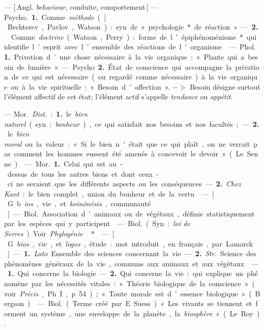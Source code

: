 \begin{itemize}[leftmargin=1cm, label=, itemsep=1pt]
 — [\,Angl. {\it behaviour}, conduite, comportement\,] — \si{Psycho.}
{\bf 1.} Comme {\it méthode} ([\,Bechterev,
Pavlov, Watson) : syn. de « psychologie* de réaction ». — {\bf 2.}  Comme
{\it doctrine} (Watson, Perry) : forme de
l'épiphénoménisme* qui identifie
l'esprit avec l’ensemble des réactions
de l'organisme.

 — \si{Phol.} {\bf 1.} Privation d’une
chose nécessaire à la vie organique :
« Plante qui a besoin de lumière ».

— \si{Psycho} {\bf 2.} État de conscience
qui accompagne la privation de ce
qui est nécessaire (ou regardé comme
nécessaire) à la vie organique ou à la
vie spirituelle : « Besoin d'affection ».
$->$ Besoin désigne surtout l'élément
affectif de cet état; l’élément actif
s'appelle {\it tendance} ou {\it appétit}.

 — \si{Mor.} {\it Dist.} : {\bf 1.} le {\it bien naturel}
(syn. : {\it bonheur}), ce qui satisfait nos
besoins et nos facultés; — {\bf 2.} le {\it bien
moral} ou la valeur : « Si le bien
n'était que ce qui plaît, on ne verrait pas comment les hommes eussent
été amenés à concevoir le devoir »
(Le Senne).

 — \si{Mor.} {\bf 1.} Celui
qui est au-dessus de tous les autres
biens et dont ceux-ci ne seraient que
les différents aspects ou les conséquences. — {\bf 2.} {\it Chez Kant} : le bien
complet, union du bonheur et de la
vertu.

 — [\,G. b{\it ios}, vie, et {\it koinônésis},
communauté\,] — \si{Biol.} Association
d'animaux ou de végétaux, définie
statistiquement par les espèces qui y
participent.

 — \si{Biol.} (Syn. :
{\it loi de Serres}). Voir {\it Phylogénie}\,*.

 — [\,G. {\it bios}, vie, et {\it logos}, étude :
mot introduit, en français, par
Lamarck\,] — {\bf 1.} {\it Lato}. Ensemble des
sciences concernant la vie. — {\bf 2.} {\it Str.}
Science des phénomènes généraux
de la vie, communs aux animaux et
aux végétaux.

 — {\bf 1.} Qui concerne la
biologie. — {\bf 2.} Qui concerne la vie:
qui explique un phénomène par les
nécessités vitales : « Théorie biologique
de la conscience » (voir {\it Précis},
Ph. I, p. 54); « Toute morale est
d'essence biologique » (Bergson).

 — \si{Biol.} (Terme créé par
E. Suess). « Les vivants se tiennent
et forment un système, une enveloppe de la planète, la {\it biosphère} »
(Le Roy).


\end{itemize}
